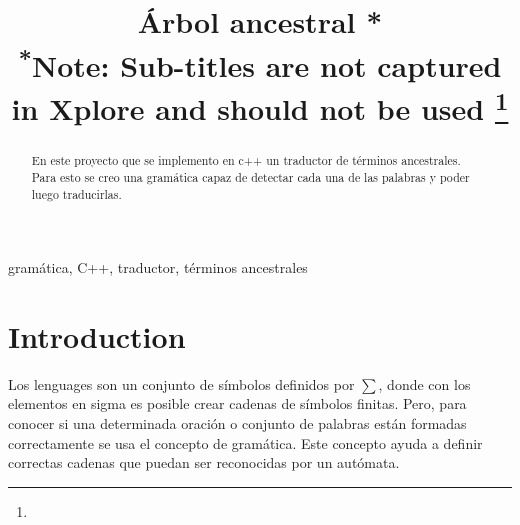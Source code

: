 \documentclass[conference]{IEEEtran}
\begin{document}
\title{\'Arbol ancestral *\\
{\footnotesize \textsuperscript{*}Note: Sub-titles are not captured in Xplore and
should not be used}
\thanks{}
}

\author{
\and
{}
\and
{}
}

\maketitle

\begin{abstract}
En este proyecto que se implemento en c++ un traductor de t\'erminos ancestrales. Para esto se creo una gram\'atica capaz de detectar cada una de las palabras y poder luego traducirlas. 

\end{abstract}

\begin{IEEEkeywords}
gram\'atica, C++, traductor, t\'erminos ancestrales 
\end{IEEEkeywords}

\section{Introduction}
Los lenguages son un conjunto de s\'imbolos definidos por $\sum$, 
donde con los elementos en sigma es posible crear cadenas de s\'imbolos finitas. Pero, para conocer si una determinada oraci\'on o conjunto de palabras est\'an formadas correctamente se usa el concepto de gram\'atica. Este concepto ayuda a definir correctas cadenas que puedan ser reconocidas por un aut\'omata. 
\end{document}
